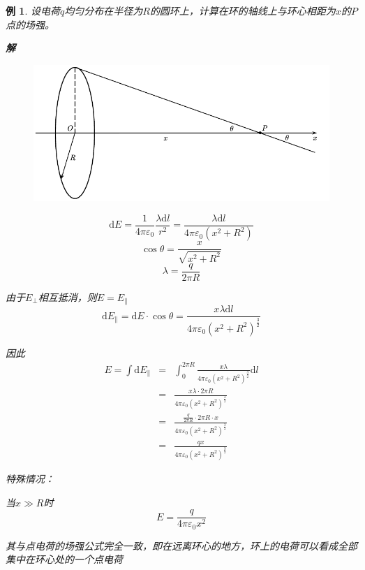 \documentclass[12pt, a4paper, twoside]{ctexbook}
\newtheorem{example}[theorem]{例}
\begin{document}
\begin{example}
    设电荷$q$均匀分布在半径为$R$的圆环上，计算在环的轴线上与环心相距为$x$的$P$点的场强。

    \noindent\textbf{解}
    \begin{figure}[H]
        \centerline{\includegraphics[scale=1.0]{CH09EX02.pdf}}
    \end{figure}
    $$
    \mathrm{d}E=\frac{1}{4\pi\varepsilon_0}\frac{\lambda \mathrm{d}l}{r^2}=\frac{\lambda \mathrm{d}l}{4\pi\varepsilon_0\left(x^2+R^2\right)}
    $$
    $$
    \cos\theta=\frac{x}{\sqrt{x^2+R^2}}
    $$
    $$
    \lambda=\frac{q}{2\pi R}
    $$
    
    由于$E_\bot$相互抵消，则$E=E_\parallel$
    $$
    \mathrm{d}E_\parallel=\mathrm{d}E\cdot\cos\theta=\frac{x\lambda\mathrm{d}l}{4\pi\varepsilon_0\left(x^2+R^2\right)^{\frac{3}{2}}}
    $$
    
    因此
    \begin{eqnarray}
        E=\int\mathrm{d}E_\parallel &=&\int_{0}^{2\pi R}\frac{x\lambda}{4\pi\varepsilon_0\left(x^2+R^2\right)^{\frac{3}{2}}}\mathrm{d}l \nonumber \\
        ~&=&\frac{x\lambda\cdot 2\pi R}{4\pi\varepsilon_0\left(x^2+R^2\right)^{\frac{3}{2}}} \nonumber \\
        ~&=&\frac{\frac{q}{2\pi R}\cdot 2\pi R\cdot x}{4\pi\varepsilon_0\left(x^2+R^2\right)^{\frac{3}{2}}} \nonumber \\
        ~&=&\frac{qx}{4\pi\varepsilon_0\left(x^2+R^2\right)^{\frac{3}{2}}} \nonumber
    \end{eqnarray}

    {\sonti 特殊情况}：
    
    当$x\gg R$时
    $$
    E=\frac{q}{4\pi\varepsilon_0 x^2}
    $$
    
    其与点电荷的场强公式完全一致，即在远离环心的地方，环上的电荷可以看成全部集中在环心处的一个点电荷
\end{example}
\end{document}
